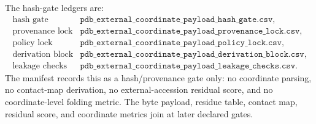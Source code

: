 The hash-gate ledgers are:
\[
\begin{array}{ll}
\text{hash gate} & \texttt{pdb\_external\_coordinate\_payload\_hash\_gate.csv},\\
\text{provenance lock} & \texttt{pdb\_external\_coordinate\_payload\_provenance\_lock.csv},\\
\text{policy lock} & \texttt{pdb\_external\_coordinate\_payload\_policy\_lock.csv},\\
\text{derivation block} & \texttt{pdb\_external\_coordinate\_payload\_derivation\_block.csv},\\
\text{leakage checks} & \texttt{pdb\_external\_coordinate\_payload\_leakage\_checks.csv}.
\end{array}
\]
The manifest records this as a hash/provenance gate only: no coordinate parsing, no contact-map derivation, no external-accession residual score, and no coordinate-level folding metric. The byte payload, residue table, contact map, residual score, and coordinate metrics join at later declared gates.
